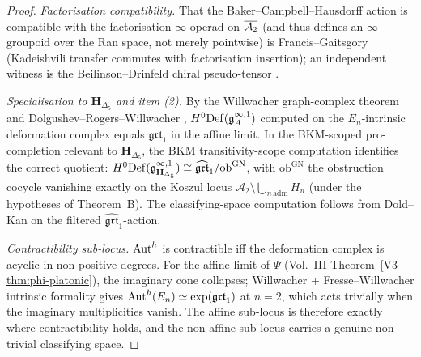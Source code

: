 \begin{proof}
\emph{Factorisation compatibility.} That the Baker--Campbell--Hausdorff
action is compatible with the factorisation $\infty$-operad on $\overline{\mathcal{A}_2}$
(and thus defines an $\infty$-groupoid over the Ran space, not merely
pointwise) is Francis--Gaitsgory \cite[]{FrancisGaitsgory2012}
(Kadeishvili transfer commutes with factorisation insertion); an
independent witness is the Beilinson--Drinfeld chiral pseudo-tensor
\cite[]{BD04}.

\emph{Specialisation to $\mathbf H_{\Delta_5}$ and item (2).} By the
Willwacher graph-complex theorem \cite[Theorem~1.1]{Willwacher15} and
Dolgushev--Rogers--Willwacher \cite{DolgushevRogersWillwacher15},
$H^0\mathrm{Def}(\mathfrak g^{\infty,1}_A)$ computed on the $E_n$-intrinsic
deformation complex equals $\mathfrak{grt}_1$ in the affine limit. In
the BKM-scoped pro-completion relevant to $\mathbf H_{\Delta_5}$, the
BKM transitivity-scope computation identifies the correct quotient:
$H^0\mathrm{Def}(\mathfrak g^{\infty,1}_{\mathbf
H_{\Delta_5}}) \cong \widehat{\mathfrak{grt}}_1/\mathrm{ob}^{\mathrm{GN}}$,
with $\mathrm{ob}^{\mathrm{GN}}$ the obstruction cocycle vanishing
exactly on the Koszul locus
$\overline{\mathcal A_2}\setminus\bigcup_{n\,\mathrm{adm}}H_n$
(under the hypotheses of Theorem~B). The
classifying-space computation follows from Dold--Kan on the filtered
$\widehat{\mathfrak{grt}}_1$-action.

\emph{Contractibility sub-locus.} $\operatorname{Aut}^h$ is contractible iff the
deformation complex is acyclic in non-positive degrees. For the affine
limit of $\Psi$ (Vol.~III Theorem~\ref{V3-thm:phi-platonic}), the
imaginary cone collapses; Willwacher + Fresse--Willwacher
\cite{FresseWillwacher20} intrinsic formality gives
$\operatorname{Aut}^h(E_n)\simeq\exp(\mathfrak{grt}_1)$ at $n=2$, which acts trivially
when the imaginary multiplicities vanish. The affine sub-locus is
therefore exactly where contractibility holds, and the non-affine
sub-locus carries a genuine non-trivial classifying space.
\end{proof}

